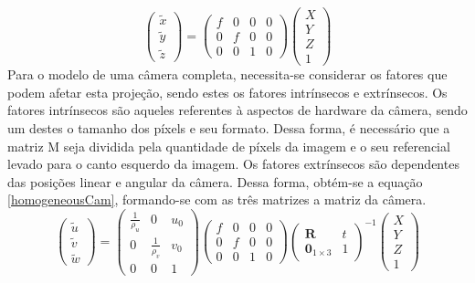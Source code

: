 \documentclass{bmvc2k}
\begin{document}
\begin{equation}\label{homogeneosPinhole}
\left( \begin{array}{l}{\tilde{x}} \\ {\tilde{y}} \\ {\tilde{z}}\end{array}\right)=\left( \begin{array}{llll}{f} & {0} & {0} & {0} \\ {0} & {f} & {0} & {0} \\ {0} & {0} & {1} & {0}\end{array}\right) \left( \begin{array}{l}{X} \\ {Y} \\ {Z} \\ {1}\end{array}\right)
\end{equation}
Para o modelo de uma câmera completa, necessita-se considerar os fatores que podem afetar esta projeção, sendo estes os fatores intrínsecos e extrínsecos. Os fatores intrínsecos são aqueles referentes à aspectos de hardware da câmera, sendo um destes o tamanho dos píxels e seu formato. Dessa forma, é necessário que a matriz M seja dividida pela quantidade de píxels da imagem e o seu referencial levado para o canto esquerdo da imagem. Os fatores extrínsecos são dependentes das posições linear e angular da câmera. Dessa forma, obtém-se a equação \ref{homogeneousCam}, formando-se com as três matrizes a matriz da câmera.\\

\begin{equation}\label{homogeneousCam}
    \left( \begin{array}{c}{\tilde{u}} \\ {\tilde{v}} \\ {\tilde{w}}\end{array}\right)=\left( \begin{array}{ccc}{\frac{1}{\rho_{u}}} & {0} & {u_{0}} \\ {0} & {\frac{1}{\rho_{v}}} & {v_{0}} \\ {0} & {0} & {1}\end{array}\right) \left( \begin{array}{cccc}{f} & {0} & {0} & {0} \\ {0} & {f} & {0} & {0} \\ {0} & {0} & {1} & {0}\end{array}\right) \left( \begin{array}{cc}{\mathbf{R}} & {t} \\ {\mathbf{0}_{1 \times 3}} & {1}\end{array}\right)^{-1} \left( \begin{array}{c}{X} \\ {Y} \\ {Z} \\ {1}\end{array}\right)
\end{equation}
\end{document}
